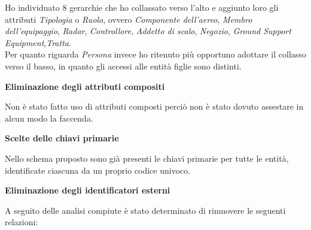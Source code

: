 

\textsf{\small Ho individuato 8 gerarchie che ho collassato verso l'alto e aggiunto loro gli attributi \emph{Tipologia} o \emph{Ruolo}, ovvero \emph{Componente dell'aereo}, \emph{Membro dell'equipaggio}, \emph{Radar}, \emph{Controllore}, \emph{Addetto di scalo}, \emph{Negozio}, \emph{Ground Support Equipment},\emph{Tratta}.}\\

\textsf{\small Per quanto riguarda \emph{Persona} invece ho ritenuto più opportuno adottare il collasso verso il basso, in quanto gli accessi alle entità figlie sono distinti.}\break


\textbf{Eliminazione degli attributi compositi}

\textsf{\small Non è stato fatto uso di attributi composti perciò non è stato dovuto assestare in alcun modo la faccenda.}\break %

\textbf{Scelte delle chiavi primarie}

\textsf{\small Nello schema proposto sono già presenti le chiavi primarie per tutte le entità, identificate ciascuna da un proprio codice univoco.}\break

\textbf{Eliminazione degli identificatori esterni}

\textsf{\small A seguito delle analisi compiute è stato determinato di rimuovere le seguenti relazioni:}\\ %

